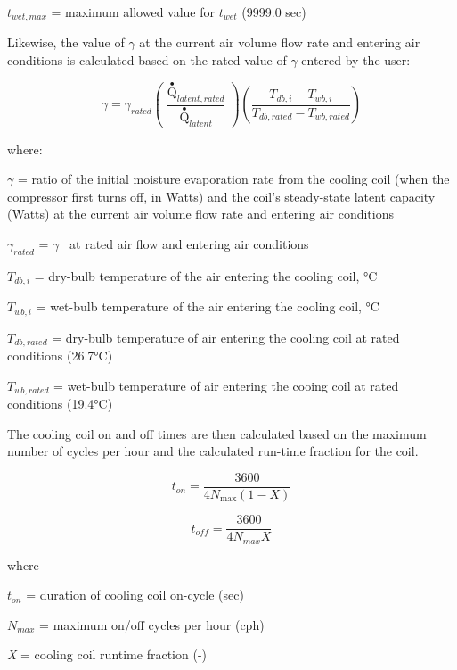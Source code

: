 \(t_{wet,max}\) = maximum allowed value for \(t_{wet}\) (9999.0 sec)

Likewise, the value of \(\gamma\) at the current air volume flow rate and entering air conditions is calculated based on the rated value of \(\gamma\) entered by the user:

\begin{equation}
  \gamma = {\gamma_{rated}}\left( {\frac{{{{\mathop Q\limits^ \bullet  }_{latent,rated}}}}{{{{\mathop Q\limits^ \bullet  }_{latent}}}}} \right)\left( {\frac{{{T_{db,i}} - {T_{wb,i}}}}{{{T_{db,rated}} - {T_{wb,rated}}}}} \right)
\end{equation}

where:

\(\gamma\) = ratio of the initial moisture evaporation rate from the cooling coil (when the compressor first turns off, in Watts) and the coil's steady-state latent capacity (Watts) at the current air volume flow rate and entering air conditions

\({\gamma_{rated}}\) = \(\gamma\) ~at rated air flow and entering air conditions

\(T_{db,i}\) = dry-bulb temperature of the air entering the cooling coil, °C

\(T_{wb,i}\) = wet-bulb temperature of the air entering the cooling coil, °C

\(T_{db,rated}\) = dry-bulb temperature of air entering the cooling coil at rated conditions (26.7°C)

\(T_{wb,rated}\) = wet-bulb temperature of air entering the cooing coil at rated conditions (19.4°C)

The cooling coil on and off times are then calculated based on the maximum number of cycles per hour and the calculated run-time fraction for the coil.

\begin{equation}
{t_{on}} = \frac{{3600}}{{4{N_{\max }}\left( {1 - X} \right)}}
\end{equation}

\begin{equation}
{t_{off}} = \frac{{3600}}{{4{N_{max}}X}}
\end{equation}

where

\(t_{on}\) = duration of cooling coil on-cycle (sec)

\(N_{max}\) = maximum on/off cycles per hour (cph)

\emph{X} = cooling coil runtime fraction (-)

